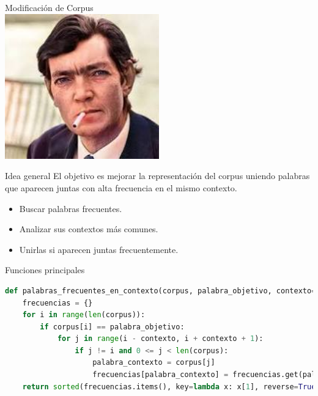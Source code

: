 \documentclass{beamer}
\begin{document}
\begin{frame}{}
	\centering
	\Large Modificación de Corpus\\
	\vspace{0.8cm}
	\includegraphics[width=0.5\textwidth]{imagen_cortazar}
\end{frame}
	
\begin{frame}{Idea general}
	El objetivo es mejorar la representación del corpus uniendo palabras que aparecen juntas con alta frecuencia en el mismo contexto.
	\begin{itemize}
		\item Buscar palabras frecuentes.
		\item Analizar sus contextos más comunes.
		\item Unirlas si aparecen juntas frecuentemente.
	\end{itemize}
\end{frame}

\begin{frame}[fragile]{Funciones principales}
	\begin{lstlisting}[language=Python]
def palabras_frecuentes_en_contexto(corpus, palabra_objetivo, contexto=1):
	frecuencias = {}
	for i in range(len(corpus)):
		if corpus[i] == palabra_objetivo:
			for j in range(i - contexto, i + contexto + 1):
				if j != i and 0 <= j < len(corpus):
					palabra_contexto = corpus[j]
					frecuencias[palabra_contexto] = frecuencias.get(palabra_contexto, 0) + 1
	return sorted(frecuencias.items(), key=lambda x: x[1], reverse=True)
	\end{lstlisting}
\end{frame}
\end{document}
